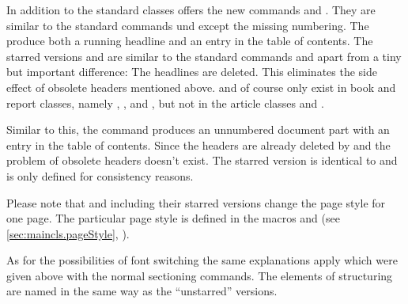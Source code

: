 \begin{Declaration}
  \\
  \\
  \\
  \\
  \\
\end{Declaration}%
%
%
%
%
%
%
In addition to the standard classes {\KOMAScript} offers the new
commands  and . They are similar to the
standard commands  und  except the
missing numbering. The produce both a running headline and an entry in
the table of contents. The starred versions  and
 are similar to the standard commands 
and  apart from a tiny but important difference: The
headlines are deleted. This eliminates the side effect of obsolete
headers mentioned above. 
and  of course only exist in book and report classes,
namely , ,  and
, but not in the article classes  and
.

Similar to this, the command  produces an unnumbered
document part with an entry in the table of contents. Since the
headers are already deleted by  and  the
problem of obsolete headers doesn't exist. The starred version
 is identical to  and is only defined for
consistency reasons.

Please note that  and  including their
starred versions change the page style for one page. The particular
page style is defined in the macros  and
 (see \autoref{sec:maincls.pageStyle},
).

As for the possibilities of font switching %
the same explanations apply which were given above with the normal
sectioning commands. The elements of structuring are named in the same
way as the ``unstarred'' versions.
%
%
%
%
%
%
%


